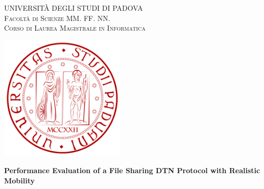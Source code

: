 
\begin{titlepage}
    \begin{center}
        {\Large UNIVERSITÀ DEGLI STUDI DI PADOVA}\\
        \vspace{0.2cm}                                                  %
        {\Large \scshape Facoltà di Scienze MM. FF. NN.}\\
        \vspace{2mm}
        {\Large \scshape Corso di Laurea Magistrale in Informatica}\\
        \vspace{2mm}                                                      %
        
        \vspace{0.3cm}
        \includegraphics[width=6cm]{figure/unipd_logo}\\
        \vspace{2cm}
        
        \vspace{2cm}
        {\LARGE \bfseries Performance Evaluation of a File Sharing DTN Protocol with Realistic Mobility} \\
        \vspace{4cm}
    \end{center}


\end{titlepage}
